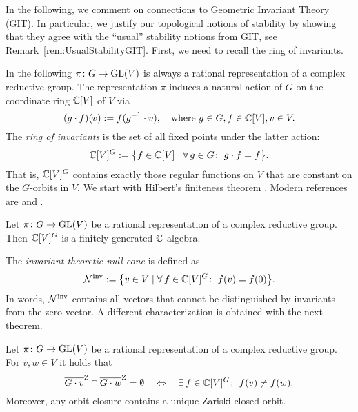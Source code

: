 
In the following, we comment on connections to Geometric Invariant Theory (GIT).
In particular, we justify our topological notions of stability by showing that they agree with the ``usual'' stability notions from GIT, see Remark~\ref{rem:UsualStabilityGIT}. First, we need to recall the ring of invariants.

In the following $\pi \colon G \to \operatorname{GL}(V)$ is always a rational representation of a complex reductive group.
The representation $\pi$ induces a natural action of $G$ on the coordinate ring $\mathbb C[V]$ of $V$ via 
	\[ (g \cdot f)(v) := f(g^{-1} \cdot v), \quad \text{where } g\in G, f \in \mathbb C[V], v \in V.\]
The \emph{ring of invariants} is the set of all fixed points under the latter action:
	\[\mathbb C[V]^G := \big\{ f \in \mathbb C[V] \mid \forall \, g \in G \colon \; g\cdot f = f \big\}. \]
That is, $\mathbb C[V]^G$ contains exactly those regular functions on $V$ that are constant on the $G$-orbits in $V$.
We start with Hilbert's finiteness theorem \cite{Hilbert1890, Hilbert1893}. Modern references are \cite[Theorem~2.2.10]{DerksenKemperBook} and \cite[Theorem~3.5]{PopovVinberg}.

\begin{theorem}[Hilbert] \label{thm:HilbertInvariantRing}
	Let $\pi \colon G \to \operatorname{GL}(V)$ be a rational representation of a complex reductive group. Then $\mathbb C[V]^G$ is a finitely generated $\mathbb C$-algebra.
\end{theorem}

The \emph{invariant-theoretic null cone} is defined as
	\[ \mathcal{N}^{\text{inv}} := \big\{ v \in V \mid \forall \, f \in \mathbb C[V]^G \colon \; f(v) = f(0)\big\} .\]
In words, $\mathcal{N}^{\text{inv}}$ contains all vectors that cannot be distinguished by invariants from the zero vector. A different characterization is obtained with the next theorem.

\begin{theorem}\label{thm:GeneratingInvariantsSeparate}
	Let $\pi \colon G \to \operatorname{GL}(V)$ be a rational representation of a complex reductive group. For $v,w \in V$ it holds that
		\[ \overline{G \cdot v}^{\operatorname{Z}} \cap \overline{G \cdot w}^{\operatorname{Z}} = \emptyset \quad \Leftrightarrow \quad
		\exists \, f \in \mathbb C[V]^G \colon \; f(v) \neq f(w) . \]
	Moreover, any orbit closure contains a unique Zariski closed orbit.
\end{theorem}

